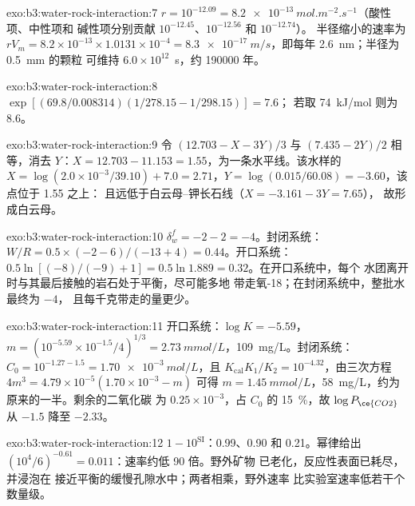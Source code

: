 \begin{solution}{exo:b3:water-rock-interaction:7}
$r = 10^{-12.09} = \qty{8.2e-13}{mol.m^{-2}.s^{-1}}$（酸性项、中性项和
碱性项分别贡献 $10^{-12.45}$、$10^{-12.56}$ 和 $10^{-12.74}$）。
半径缩小的速率为 $rV_m = 8.2\times10^{-13}\times1.0131\times10^{-4} =
\qty{8.3e-17}{m/s}$，即每年 \qty{2.6}{nm}；半径为 \qty{0.5}{mm} 的颗粒
可维持 $6.0\times10^{12}$~s，约 \num{190000} 年。
\end{solution}

\begin{solution}{exo:b3:water-rock-interaction:8}
$\exp[(69.8/0.008314)(1/278.15 - 1/298.15)] = 7.6$；
若取 \qty{74}{kJ/mol} 则为 8.6。
\end{solution}

\begin{solution}{exo:b3:water-rock-interaction:9}
令 $(12.703 - X - 3Y)/3$ 与 $(7.435 - 2Y)/2$ 相等，消去 $Y$：$X =
12.703 - 11.153 = 1.55$，为一条水平线。该水样的 $X = \log(2.0\times
10^{-3}/39.10) + 7.0 = 2.71$，$Y = \log(0.015/60.08) = -3.60$，该点位于 1.55 之上：
且远低于白云母–钾长石线（$X = -3.161 - 3Y = 7.65$），
故形成白云母。
\end{solution}

\begin{solution}{exo:b3:water-rock-interaction:10}
$\delta_w^f = -2 - 2 = -4$。封闭系统：$W/R = 0.5\times(-2 - 6)/(-13 + 4) =
0.44$。开口系统：$0.5\ln[(-8)/(-9) + 1] = 0.5\ln1.889 = 0.32$。在开口系统中，每个
水团离开时与其最后接触的岩石处于平衡，尽可能多地
带走氧-18；在封闭系统中，整批水最终为 $-4$，
且每千克带走的量更少。
\end{solution}

\begin{solution}{exo:b3:water-rock-interaction:11}
开口系统：$\log K = -5.59$，$m = (10^{-5.59}\times10^{-1.5}/4)^{1/3} =
\qty{2.73}{mmol/L}$，\qty{109}{mg/L}。封闭系统：$C_0 = 10^{-1.27 - 1.5} =
\qty{1.70e-3}{mol/L}$，且 $K_{\mathrm{cal}}K_1/K_2 = 10^{-4.32}$，由三次方程
$4m^3 = 4.79\times10^{-5}(1.70\times10^{-3} - m)$ 可得 $m =
\qty{1.45}{mmol/L}$，\qty{58}{mg/L}，约为原来的一半。剩余的二氧化碳
为 $0.25\times10^{-3}$，占 $C_0$ 的 \qty{15}{\percent}，故 $\log P_{\ce{CO2}}$
从 $-1.5$ 降至 $-2.33$。
\end{solution}

\begin{solution}{exo:b3:water-rock-interaction:12}
$1 - 10^{\mathrm{SI}}$：0.99、0.90 和 0.21。幂律给出
$(10^4/6)^{-0.61} = 0.011$：速率约低 90 倍。野外矿物
已老化，反应性表面已耗尽，并浸泡在
接近平衡的缓慢孔隙水中；两者相乘，野外速率
比实验室速率低若干个数量级。
\end{solution}

